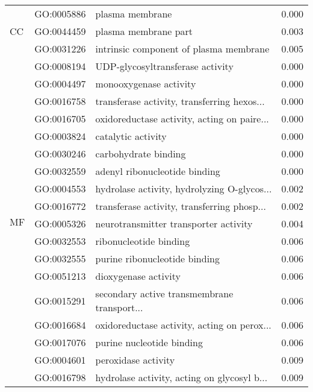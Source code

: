 \begin{longtable}{lllr}
\cline{1-4}
\multirow{3}{*}{CC} & GO:0005886 &                              plasma membrane &         0.000 \\
   & GO:0044459 &                         plasma membrane part &         0.003 \\
   & GO:0031226 &       intrinsic component of plasma membrane &         0.005 \\
\cline{1-4}
\multirow{48}{*}{MF} & GO:0008194 &             UDP-glycosyltransferase activity &         0.000 \\
   & GO:0004497 &                       monooxygenase activity &         0.000 \\
   & GO:0016758 &  transferase activity, transferring hexos... &         0.000 \\
   & GO:0016705 &  oxidoreductase activity, acting on paire... &         0.000 \\
   & GO:0003824 &                           catalytic activity &         0.000 \\
   & GO:0030246 &                         carbohydrate binding &         0.000 \\
   & GO:0032559 &                adenyl ribonucleotide binding &         0.000 \\
   & GO:0004553 &  hydrolase activity, hydrolyzing O-glycos... &         0.002 \\
   & GO:0016772 &  transferase activity, transferring phosp... &         0.002 \\
   & GO:0005326 &        neurotransmitter transporter activity &         0.004 \\
   & GO:0032553 &                       ribonucleotide binding &         0.006 \\
   & GO:0032555 &                purine ribonucleotide binding &         0.006 \\
   & GO:0051213 &                         dioxygenase activity &         0.006 \\
   & GO:0015291 &  secondary active transmembrane transport... &         0.006 \\
   & GO:0016684 &  oxidoreductase activity, acting on perox... &         0.006 \\
   & GO:0017076 &                    purine nucleotide binding &         0.006 \\
   & GO:0004601 &                          peroxidase activity &         0.009 \\
   & GO:0016798 &  hydrolase activity, acting on glycosyl b... &         0.009 \\

\end{longtable}
